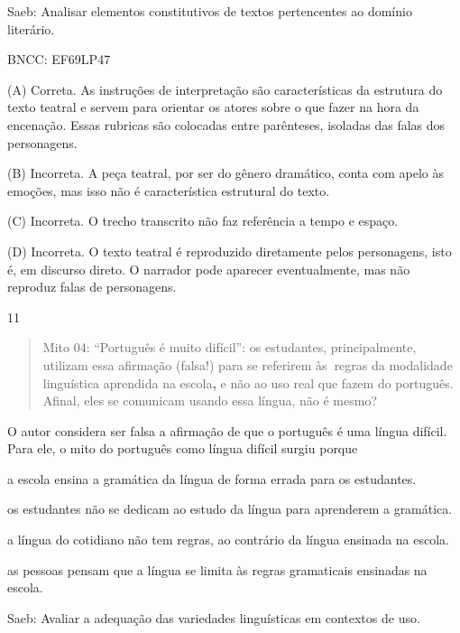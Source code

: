 Saeb: Analisar elementos constitutivos de textos pertencentes ao domínio
literário.

BNCC: EF69LP47

(A) Correta. As instruções de interpretação são características da
estrutura do texto teatral e servem para orientar os atores sobre o que
fazer na hora da encenação. Essas rubricas são colocadas entre
parênteses, isoladas das falas dos personagens.

(B) Incorreta. A peça teatral, por ser do gênero dramático, conta com
apelo às emoções, mas isso não é característica estrutural do texto.

(C) Incorreta. O trecho transcrito não faz referência a tempo e espaço.

(D) Incorreta. O texto teatral é reproduzido diretamente pelos
personagens, isto é, em discurso direto. O narrador pode aparecer
eventualmente, mas não reproduz falas de personagens.

\num{11}

\begin{quote}
Mito 04: ``Português é muito difícil'': os estudantes, principalmente,
utilizam essa afirmação (falsa!) para se referirem às\textbf{~}regras da
modalidade linguística aprendida na escola\textbf{,} e não ao uso real
que fazem do português. Afinal, eles se comunicam usando essa língua,
não é mesmo?
\end{quote}


O autor considera ser falsa a afirmação de que o português é uma língua
difícil. Para ele, o mito do português como língua difícil surgiu porque

\begin{escolha}
\item a escola ensina a gramática da língua de forma errada para os
estudantes.

\item os estudantes não se dedicam ao estudo da língua para aprenderem a
gramática.

\item a língua do cotidiano não tem regras, ao contrário da língua ensinada
na escola.

\item as pessoas pensam que a língua se limita às regras gramaticais
ensinadas na escola.
\end{escolha}

Saeb: Avaliar a adequação das variedades linguísticas em contextos de
uso.

